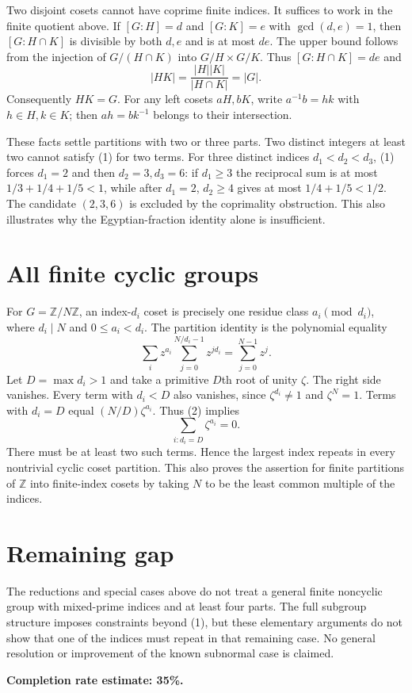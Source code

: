 \documentclass[11pt]{article}
\begin{document}
Two disjoint cosets cannot have coprime finite indices. It suffices to work in the finite quotient above. If $[G:H]=d$ and $[G:K]=e$ with $\gcd(d,e)=1$, then $[G:H\cap K]$ is divisible by both $d,e$ and is at most $de$. The upper bound follows from the injection of $G/(H\cap K)$ into $G/H\times G/K$. Thus $[G:H\cap K]=de$ and
\[
 |HK|=\frac{|H||K|}{|H\cap K|}=|G|.
\]
Consequently $HK=G$. For any left cosets $aH,bK$, write $a^{-1}b=hk$ with $h\in H,k\in K$; then $ah=bk^{-1}$ belongs to their intersection.

These facts settle partitions with two or three parts. Two distinct integers at least two cannot satisfy (1) for two terms. For three distinct indices $d_1<d_2<d_3$, (1) forces $d_1=2$ and then $d_2=3,d_3=6$: if $d_1\ge3$ the reciprocal sum is at most $1/3+1/4+1/5<1$, while after $d_1=2$, $d_2\ge4$ gives at most $1/4+1/5<1/2$. The candidate $(2,3,6)$ is excluded by the coprimality obstruction. This also illustrates why the Egyptian-fraction identity alone is insufficient.

\section*{All finite cyclic groups}
For $G=\mathbb Z/N\mathbb Z$, an index-$d_i$ coset is precisely one residue class $a_i\pmod{d_i}$, where $d_i\mid N$ and $0\le a_i<d_i$. The partition identity is the polynomial equality
\[
 \sum_i z^{a_i}\sum_{j=0}^{N/d_i-1}z^{jd_i}
 =\sum_{j=0}^{N-1}z^j. \tag{2}
\]
Let $D=\max d_i>1$ and take a primitive $D$th root of unity $\zeta$. The right side vanishes. Every term with $d_i<D$ also vanishes, since $\zeta^{d_i}\ne1$ and $\zeta^N=1$. Terms with $d_i=D$ equal $(N/D)\zeta^{a_i}$. Thus (2) implies
\[
 \sum_{i:d_i=D}\zeta^{a_i}=0.
\]
There must be at least two such terms. Hence the largest index repeats in every nontrivial cyclic coset partition. This also proves the assertion for finite partitions of $\mathbb Z$ into finite-index cosets by taking $N$ to be the least common multiple of the indices.

\section*{Remaining gap}
The reductions and special cases above do not treat a general finite noncyclic group with mixed-prime indices and at least four parts. The full subgroup structure imposes constraints beyond (1), but these elementary arguments do not show that one of the indices must repeat in that remaining case. No general resolution or improvement of the known subnormal case is claimed.

\textbf{Completion rate estimate: 35\%.}
\end{document}
